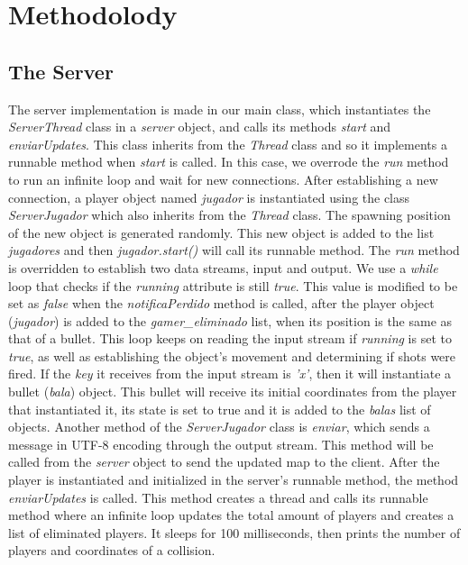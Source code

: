 \documentclass[10pt,a4paper]{article}
\theoremstyle{definition}
\begin{document}
\section{Methodolody}
\subsection{The Server}
The server implementation is made in our main class, which instantiates the \textit{ServerThread} class in a \textit{server} object, and calls its methods \textit{start} and \textit{enviarUpdates}. 
This class inherits from the \textit{Thread} class and so it implements a runnable method when \textit{start} is called. 
In this case, we overrode the \textit{run} method to run an infinite loop and wait for new connections. 
After establishing a new connection, a player object named \textit{jugador} is instantiated using the class \textit{ServerJugador} which also inherits from the \textit{Thread} class. 
The spawning position of the new object is generated randomly. 
This new object is added to the list \textit{jugadores} and then \textit{jugador.start()} will call its runnable method. 
The \textit{run} method is overridden to establish two data streams, input and output. 
We use a \textit{while} loop that checks if the \textit{running} attribute is still \textit{true}. 
This value is modified to be set as \textit{false} when the \textit{notificaPerdido} method is called, after the player object (\textit{jugador}) is added to the \textit{gamer\_eliminado} list, when its position is the same as that of a bullet. 
This loop keeps on reading the input stream if \textit{running} is set to \textit{true}, as well as establishing the object's movement and determining if shots were fired. 
If the \textit{key} it receives from the input stream is \textit{'x'}, then it will instantiate a bullet (\textit{bala}) object. 
This bullet will receive its initial coordinates from the player that instantiated it, its state is set to true and it is added to the \textit{balas} list of objects. 
Another method of the \textit{ServerJugador} class is \textit{enviar}, which sends a message in UTF-8 encoding through the output stream. 
This method will be called from the \textit{server} object to send the updated map to the client. 
After the player is instantiated and initialized in the server's runnable method, the method \textit{enviarUpdates} is called. 
This method creates a thread and calls its runnable method where an infinite loop updates the total amount of players and creates a list of eliminated players. 
It sleeps for 100 milliseconds, then prints the number of players and coordinates of a collision. 
\end{document}
